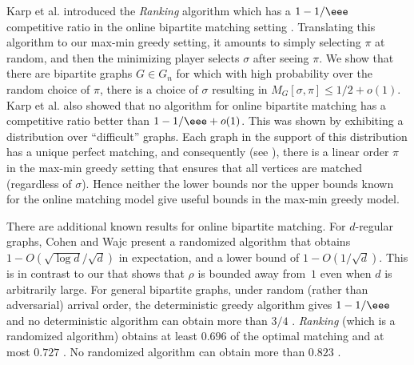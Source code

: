 Karp et al. \cite{KarpVV1990} introduced the \emph{Ranking} algorithm which
has a %
$1-1/\eee$   %
competitive ratio in the online bipartite matching setting \cite{KarpVV1990,Goel2008}. Translating this algorithm to our max-min greedy setting, it amounts to simply selecting $\pi$ at random, and then the minimizing player selects $\sigma$ after seeing $\pi$. We show that there are bipartite graphs $G \in G_n$ for which with high probability over the random choice of $\pi$, there is a choice of $\sigma$ resulting in $M_G[\sigma,\pi] \le 1/2 + o(1)$. Karp et al. \cite{KarpVV1990} also showed that no algorithm for online bipartite matching has a competitive ratio better than %
$1 - 1/\eee + o(1)$.   %
This was shown by exhibiting a distribution over ``difficult'' graphs. Each graph in the support of this distribution has a unique perfect matching, and consequently (see ), there is a linear order $\pi$ in the max-min greedy setting that ensures that all vertices are matched (regardless of $\sigma$). Hence neither the lower bounds nor the upper bounds known for the online matching model give useful bounds in the max-min greedy model.

There are additional known results for online bipartite matching.
For $d$-regular graphs, Cohen and Wajc \cite{CohenW18} present a
%
randomized  %
algorithm that obtains $1-O(\sqrt{\log d}/\sqrt{d})$ in expectation, and a lower bound of $1-O(1/\sqrt{d})$. This is in contrast to our  that shows that $\rho$ is bounded away from~$1$ even when $d$ is arbitrarily large.
For general bipartite graphs, under random (rather than adversarial) arrival order, the deterministic greedy algorithm gives %
$1-1/\eee$    %
and no deterministic algorithm can obtain more than $3/4$ \cite{Goel2008}.
\emph{Ranking} (which is a randomized algorithm) obtains at least $0.696$ of the optimal matching \cite{Mahdian2011} and at most $0.727$ \cite{Karande2011}.
No %
randomized   %
algorithm can obtain more than $0.823$ \cite{Manshadi2012}.

